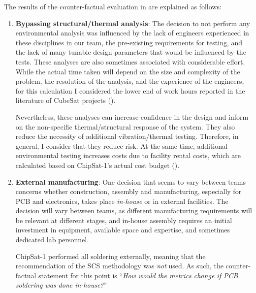 \documentclass[a4paper,nobib,justified,final]{tufte-book}
\begin{document}
The results of the counter-factual evaluation in  are explained as follows:
\begin{enumerate}
	\item \textbf{Bypassing structural/thermal analysis}:
	The decision to not perform any environmental analysis was influenced by the lack of engineers experienced in these disciplines in our team, the pre-existing requirements for testing, and the lack of many tunable design parameters that would be influenced by the tests. These analyses are also sometimes associated with considerable effort. While the actual time taken will depend on the size and complexity of the problem, the resolution of the analysis, and the experience of the engineers, for this calculation I considered the lower end of work hours reported in the literature of CubeSat projects ().

	Nevertheless, these analyses can increase confidence in the design and inform on the non-specific thermal/structural response of the system. They also reduce the necessity of additional vibration/thermal testing. Therefore, in general, I consider that they reduce risk. At the same time, additional environmental testing increases costs due to facility rental costs, which are calculated based on ChipSat-1's actual cost budget ().
	\item \textbf{External manufacturing}:
	One decision that seems to vary between teams concerns whether construction, assembly and manufacturing, especially for \acs{PCB} and electronics, takes place \emph{in-house} or in external facilities. The decision will vary between teams, as different manufacturing requirements will be relevant at different stages, and in-house assembly requires an initial investment in equipment, available space and expertise, and sometimes dedicated lab personnel.

	ChipSat-1 performed all soldering externally, meaning that the recommendation of the \acs{SCS} methodology was \emph{not} used. As such, the counter-factual statement for this point is ``\emph{How would the metrics change if \acs{PCB} soldering was done in-house?}''


\end{enumerate}
\end{document}
